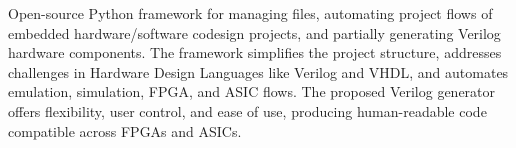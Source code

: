 Open-source Python framework for managing files, automating
project flows of embedded hardware/software codesign projects, and partially generating Verilog
hardware components. The framework simplifies the project structure, addresses challenges in
Hardware Design Languages like Verilog and VHDL, and automates emulation, simulation,
FPGA, and ASIC flows. The proposed Verilog generator offers flexibility, user control, and ease
of use, producing human-readable code compatible across FPGAs and ASICs.
